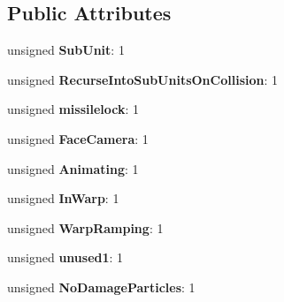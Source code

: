 \subsection*{Public Attributes}
\begin{DoxyCompactItemize}
\item 
unsigned {\bfseries Sub\+Unit}\+: 1\hypertarget{classUnit_1_1graphic__options_a99bc7030ce81a360dc120f5a2d28fed4}{}\label{classUnit_1_1graphic__options_a99bc7030ce81a360dc120f5a2d28fed4}

\item 
unsigned {\bfseries Recurse\+Into\+Sub\+Units\+On\+Collision}\+: 1\hypertarget{classUnit_1_1graphic__options_aac63ec44f218f2b6344b0f66af305169}{}\label{classUnit_1_1graphic__options_aac63ec44f218f2b6344b0f66af305169}

\item 
unsigned {\bfseries missilelock}\+: 1\hypertarget{classUnit_1_1graphic__options_aa84e412d0048a0d564b0aeecf5ea0d03}{}\label{classUnit_1_1graphic__options_aa84e412d0048a0d564b0aeecf5ea0d03}

\item 
unsigned {\bfseries Face\+Camera}\+: 1\hypertarget{classUnit_1_1graphic__options_a4af013d8c40c11c563d5fb6936e5968d}{}\label{classUnit_1_1graphic__options_a4af013d8c40c11c563d5fb6936e5968d}

\item 
unsigned {\bfseries Animating}\+: 1\hypertarget{classUnit_1_1graphic__options_aea6524e27006be978679db3a3ac07c94}{}\label{classUnit_1_1graphic__options_aea6524e27006be978679db3a3ac07c94}

\item 
unsigned {\bfseries In\+Warp}\+: 1\hypertarget{classUnit_1_1graphic__options_a5d8f8e0b8c1e6cabdb274fe0734f2746}{}\label{classUnit_1_1graphic__options_a5d8f8e0b8c1e6cabdb274fe0734f2746}

\item 
unsigned {\bfseries Warp\+Ramping}\+: 1\hypertarget{classUnit_1_1graphic__options_ae0354c97e07ebbd892b07b7794d6b832}{}\label{classUnit_1_1graphic__options_ae0354c97e07ebbd892b07b7794d6b832}

\item 
unsigned {\bfseries unused1}\+: 1\hypertarget{classUnit_1_1graphic__options_a12ba8d4af6a837b66333ad01f0ca44b2}{}\label{classUnit_1_1graphic__options_a12ba8d4af6a837b66333ad01f0ca44b2}

\item 
unsigned {\bfseries No\+Damage\+Particles}\+: 1\hypertarget{classUnit_1_1graphic__options_a7956bc74d169290cbe87eb7d3976c614}{}\label{classUnit_1_1graphic__options_a7956bc74d169290cbe87eb7d3976c614}


\end{DoxyCompactItemize}
